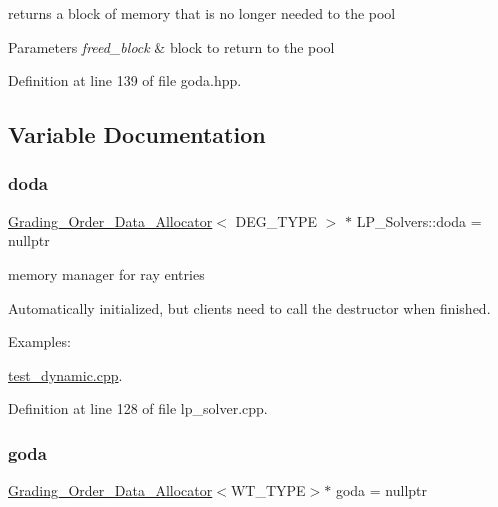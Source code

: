 returns a block of memory that is no longer needed to the pool 


\begin{DoxyParams}{Parameters}
{\em freed\+\_\+block} & block to return to the pool \\
\hline
\end{DoxyParams}


Definition at line 139 of file goda.\+hpp.



\subsection{Variable Documentation}
\mbox{\label{group__memorygroup_ga0dc763860167cb9a6e5c84bfda9a456e}} 
\subsubsection{\texorpdfstring{doda}{doda}}
{\footnotesize\ttfamily \hyperlink{group__memorygroup_class_grading___order___data___allocator}{Grading\+\_\+\+Order\+\_\+\+Data\+\_\+\+Allocator}$<$ D\+E\+G\+\_\+\+T\+Y\+PE $>$ $\ast$ L\+P\+\_\+\+Solvers\+::doda = nullptr}



memory manager for ray entries 

Automatically initialized, but clients need to call the destructor when finished. \begin{Desc}
\item[Examples\+: ]\par
\hyperlink{test_dynamic_8cpp-example}{test\+\_\+dynamic.\+cpp}.\end{Desc}


Definition at line 128 of file lp\+\_\+solver.\+cpp.

\mbox{\label{group__memorygroup_gadf1bccf09eada41d10a5d4ceda7ca479}} 
\subsubsection{\texorpdfstring{goda}{goda}}
{\footnotesize\ttfamily \hyperlink{group__memorygroup_class_grading___order___data___allocator}{Grading\+\_\+\+Order\+\_\+\+Data\+\_\+\+Allocator}$<$W\+T\+\_\+\+T\+Y\+PE$>$$\ast$ goda = nullptr}



